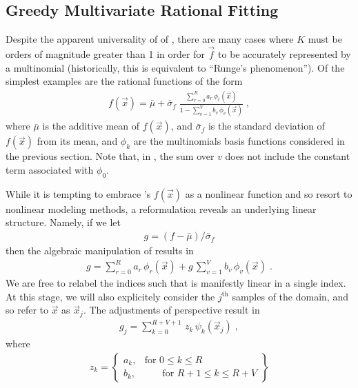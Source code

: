 \documentclass[twocolumn,aps,prd,floatfix,preprintnumbers,a4paper,nofootinbib,
superscriptaddress,10pt]{revtex4-1}
\begin{document}
\subsection{Greedy Multivariate Rational Fitting}
%
%
\par Despite the apparent universality of of , there are many cases where $K$ must be orders of magnitude greater than 1 in order for $\vec{f}$ to be accurately represented by a multinomial (historically, this is equivalent to ``Runge's phenomenon'').
%
Of the simplest examples are the rational functions of the form
%
\def\muf{\bar{\mu}}
\def\sif{\bar{\sigma}_f}
\begin{align}
  \label{eq:rat1}
  f(\vec{x}) = \muf + \sif \; \frac{ \sum_{r=0}^{R} a_r \, \phi_{r}(\vec{x}) }{ 1 - \sum_{v=1}^{V} b_v \, \phi_{v}(\vec{x}) } \;,
\end{align}
%
where $\muf$ is the additive mean of $f(\vec{x})$, and $\sif$ is the standard deviation of $f(\vec{x})$ from its mean, and $\phi_k$ are the multinomials basis functions considered in the previous section.
%
Note that, in , the sum over $v$ does not include the constant term associated with $\phi_0$.
%
\par While it is tempting to embrace 's $f({\vec{x}})$ as a nonlinear function and so resort to nonlinear modeling methods, a reformulation reveals an underlying linear structure.
%
Namely, if we let
%
\begin{align}
  g = (f - \muf)/\sif
\end{align}
%
then the algebraic manipulation of  results in
%
\begin{align}
  \label{eq:rat2}
  g = \sum_{r=0}^{R} a_r \, \phi_{r}(\vec{x}) + g\, \sum_{v=1}^{V} b_v \, \phi_{v}(\vec{x}) \; .
\end{align}
%
We are free to relabel the indices such that  is manifestly linear in a single index.
%
At this stage, we will also explicitely consider the $j^\mathrm{th}$ samples of the domain, and so refer to $\vec{x}$ as $\vec{x}_j$.
%
The adjustments of perspective result in
%
\begin{align}
  \label{eq:rat3}
  g_j = \sum_{k=0}^{R+V+1} \, z_{k} \, \psi_k(\vec{x}_j) \;,
\end{align}
%
where
%
\begin{align}
  z_k = \left\{ \begin{array}{cc}
        a_k,      & \text{for }0\leq k\leq R\\
        b_k, & \quad \;\; \;\text{for }R+1\leq k\leq R+V
      \end{array} \right\}
\end{align}
\end{document}
